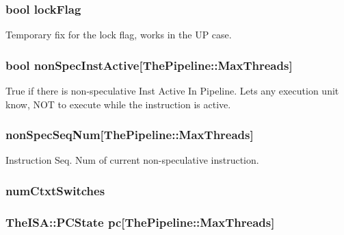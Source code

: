 \label{classInOrderCPU_a6ef203de76af61b4babb98f152867401}
\hypertarget{classInOrderCPU_aa062c7f3423632ca66107fdbb9d38131}{
\subsubsection[{lockFlag}]{\setlength{\rightskip}{0pt plus 5cm}bool {\bf lockFlag}}}
\label{classInOrderCPU_aa062c7f3423632ca66107fdbb9d38131}
Temporary fix for the lock flag, works in the UP case. \hypertarget{classInOrderCPU_aae470a34ceb26576a60c1e6ed0d6e2e4}{
\subsubsection[{nonSpecInstActive}]{\setlength{\rightskip}{0pt plus 5cm}bool {\bf nonSpecInstActive}\mbox{[}{\bf ThePipeline::MaxThreads}\mbox{]}}}
\label{classInOrderCPU_aae470a34ceb26576a60c1e6ed0d6e2e4}
True if there is non-\/speculative Inst Active In Pipeline. Lets any execution unit know, NOT to execute while the instruction is active. \hypertarget{classInOrderCPU_a4ae669709931556f7ab17a0380eed72c}{
\subsubsection[{nonSpecSeqNum}]{ {\bf nonSpecSeqNum}\mbox{[}{\bf ThePipeline::MaxThreads}\mbox{]}}}
\label{classInOrderCPU_a4ae669709931556f7ab17a0380eed72c}
Instruction Seq. Num of current non-\/speculative instruction. \hypertarget{classInOrderCPU_aa26707fae717bb36afa9b658f895d8d2}{
\subsubsection[{numCtxtSwitches}]{ {\bf numCtxtSwitches}}}
\label{classInOrderCPU_aa26707fae717bb36afa9b658f895d8d2}
\hypertarget{classInOrderCPU_a61bb24b7355c86288cba2cd9d51ad1ed}{
\subsubsection[{pc}]{\setlength{\rightskip}{0pt plus 5cm}TheISA::PCState {\bf pc}\mbox{[}{\bf ThePipeline::MaxThreads}\mbox{]}}}
